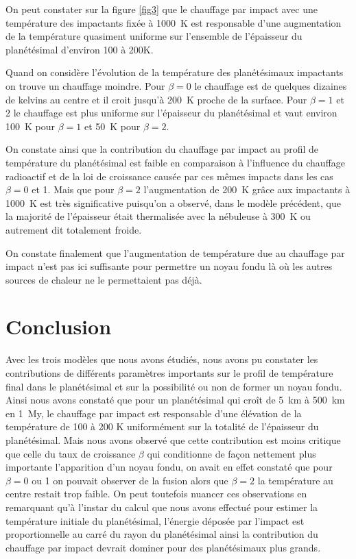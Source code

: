 \documentclass[10pt,a4paper]{article}
\numberwithin{equation}{section}
\begin{document}
On peut constater sur la figure \ref{fig3} que le chauffage par impact avec une température des impactants fixée à \SI{1000}{K} est responsable d'une augmentation de la température quasiment uniforme sur l'ensemble de l'épaisseur du planétésimal d'environ 100 à 200K. 

Quand on considère l'évolution de la température des planétésimaux impactants on trouve un chauffage moindre. Pour $\beta = 0$ le chauffage est de quelques dizaines de kelvins au centre et il croit jusqu'à \SI{200}{K} proche de la surface. Pour $\beta = 1$ et 2 le chauffage est plus uniforme sur l'épaisseur du planétésimal et vaut environ \SI{100}{K} pour $\beta = 1$ et \SI{50}{K} pour $\beta = 2$.

On constate ainsi que la contribution du chauffage par impact au profil de température du planétésimal est faible en comparaison à l'influence du chauffage radioactif et de la loi de croissance causée par ces mêmes impacts dans les cas $\beta=0$ et 1. Mais que pour $\beta = 2$ l’augmentation de \SI{200}{K} grâce aux impactants à \SI{1000}{K} est très significative puisqu'on a observé, dans le modèle précédent, que la majorité de l'épaisseur était thermalisée avec la nébuleuse à \SI{300}{K} ou autrement dit totalement froide.

On constate finalement que l'augmentation de température due au chauffage par impact n'est pas ici suffisante pour permettre un noyau fondu là où les autres sources de chaleur ne le permettaient pas déjà.


\section{Conclusion}

Avec les trois modèles que nous avons étudiés, nous avons pu constater les contributions de différents paramètres importants sur le profil de température final dans le planétésimal et sur la possibilité ou non de former un noyau fondu. Ainsi nous avons constaté que pour un planétésimal qui croît de \SI{5}{km} à \SI{500}{km} en \SI{1}{My}, le chauffage par impact est responsable d'une élévation de la température de 100 à 200 K uniformément sur la totalité de l'épaisseur du planétésimal. Mais nous avons observé que cette contribution est moins critique que celle du taux de croissance $\beta$ qui conditionne de façon nettement plus importante l'apparition d'un noyau fondu, on avait en effet constaté que pour $\beta = 0$ ou 1 on pouvait observer de la fusion alors que $\beta=2$ la température au centre restait trop faible.
On peut toutefois nuancer ces observations en remarquant qu'à l'instar du calcul que nous avons effectué pour estimer la température initiale du planétésimal, l'énergie déposée par l'impact est proportionnelle au carré du rayon du planétésimal ainsi la contribution du chauffage par impact devrait dominer pour des planétésimaux plus grands.
\end{document}
